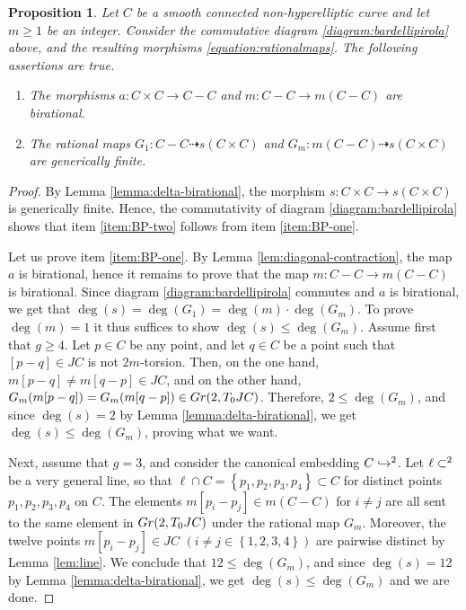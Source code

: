 \documentclass[a4paper,11pt,reqno]{amsart}
\numberwithin{equation}{section}
\theoremstyle{plain}
\newtheorem{proposition}[theorem]{Proposition}
\theoremstyle{definition}
\let\P\relax
\newcommand{\P}{\mathbb P}
\let\rm\relax
\newcommand{\rm}[1]{{\mathrm{#1}}}
\newcommand{\set}[1]{\left\{ #1 \right\}}
\begin{document}
\begin{proposition} \label{proposition:pirolabardelli-branch}
Let $C$ be a smooth connected non-hyperelliptic curve and let $m \geq 1$ be an integer. Consider the commutative diagram \eqref{diagram:bardellipirola} above, and the resulting morphisms \eqref{equation:rationalmaps}. 
The following assertions are true.
\begin{enumerate}
\item \label{item:BP-one} The morphisms $a \colon C \times C \to C - C$ and $m \colon C - C \to m(C-C)$ are birational.  
\item \label{item:BP-two} 
The rational maps $G_1 \colon C - C \dashrightarrow s(C \times C)$ and $G_m \colon m(C - C) \dashrightarrow s(C \times C)$ are generically finite.  
\end{enumerate}
\end{proposition}
\begin{proof}
By Lemma \ref{lemma:delta-birational}, the morphism $s\colon C\times C\to s(C\times C)$ is generically finite.
Hence, the commutativity of diagram \eqref{diagram:bardellipirola} shows that item \eqref{item:BP-two} follows from item \eqref{item:BP-one}.

Let us prove item \eqref{item:BP-one}. 
By Lemma \ref{lem:diagonal-contraction}, the map $a$ is birational, hence it remains to prove that the map $m \colon C-C \to m(C-C)$ is birational. Since diagram \eqref{diagram:bardellipirola} commutes and $a$ is birational, we get that $\deg(s) = \deg(G_1) = \deg(m) \cdot \deg(G_m)$. 
To prove $\deg (m)=1$ it thus suffices to show $\deg(s) \leq \deg(G_m)$. 
Assume first that $g \geq 4$. Let $p \in C$ be any point, and let $q \in C$ be a point such that $[p-q] \in JC$ is not $2m$-torsion. Then, on the one hand, $m[p-q] \neq m[q-p] \in JC$, and on the other hand, $G_m(m[p-q]) = G_m(m[q-p]) \in \rm{Gr}(2, T_0JC)$. Therefore, $2 \leq \deg(G_m)$, and since $\deg(s) = 2$ by Lemma \ref{lemma:delta-birational}, we get $\deg(s) \leq \deg(G_m)$, proving what we want.

Next, assume that $g = 3$, and consider the canonical embedding $C \hookrightarrow \P^2$. Let $\ell \subset \P^2$ be a very general line, so that $\ell \cap C = \set{p_1, p_2, p_3, p_4} \subset C$ for distinct points $p_1, p_2,p_3, p_4$ on $C$. 
The elements $m[p_i-p_j] \in m(C-C)$ for $i \neq j$ are all sent to the same element in $\rm{Gr}(2, T_0JC)$ under the rational map $G_m$. Moreover, the twelve points $m[p_i-p_j] \in JC$ $(i\neq j \in \set{1,2,3,4})$ are pairwise distinct by Lemma \ref{lem:line}. We conclude that $12 \leq \deg(G_m)$, and since $\deg(s) = 12$ by Lemma \ref{lemma:delta-birational}, we get $\deg(s) \leq \deg(G_m)$ and we are done. 
\end{proof}
\end{document}
